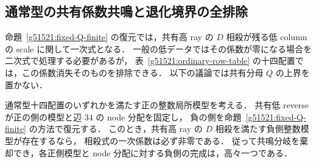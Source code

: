 \subsection{通常型の共有係数共鳴と退化境界の全排除}
\label{g51522:section}

命題~\ref{g51521:fixed-Q-finite} の復元では，共有高 ray の
$D$ 相殺が残る低 column の scale に関して一次式となる．
一般の低データではその係数が零になる場合を二次式で処理する必要があるが，
表~\ref{g51521:ordinary-row-table} の十四配置では，この係数消失そのものを排除できる．
以下の議論では共有分母 $Q$ の上界を置かない．

\begin{proposition}[通常型の非共鳴性]
\label{g51522:no-resonance}
通常型十四配置のいずれかを満たす正の整数局所模型を考える．
共有低 reverse が正の側の模型と辺 $34$ の node 分配を固定し，
負の側を命題~\ref{g51521:fixed-Q-finite} の方法で復元する．
このとき，共有高 ray の $D$ 相殺を満たす負側整数模型が存在するなら，
相殺式の一次係数は必ず非零である．
従って共鳴分岐を棄却でき，各正側模型と node 分配に対する負側の完成は，高々一つである．
\end{proposition}

